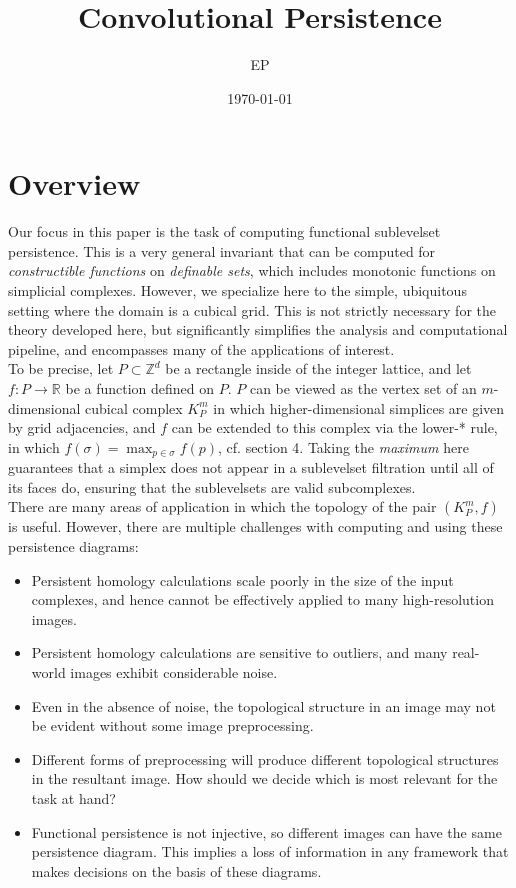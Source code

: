 \documentclass[12pt]{amsart}
\title{Convolutional Persistence}
\author{EP}
\date{\today}
\numberwithin{figure}{section}
\begin{document}
	
	\maketitle
	\thispagestyle{empty}
	
	
\section{Overview}
Our focus in this paper is the task of computing functional sublevelset persistence. This is a very general invariant that can be computed for \emph{constructible functions} on \emph{definable sets}, which includes monotonic functions on simplicial complexes. However, we specialize here to the simple, ubiquitous setting where the domain is a cubical grid. This is not strictly necessary for the theory developed here, but significantly simplifies the analysis and computational pipeline, and encompasses many of the applications of interest.\\

To be precise, let $P \subset \mathbb{Z}^d$ be a rectangle inside of the integer lattice, and let $f: P \to \mathbb{R}$ be a function defined on $P$. $P$ can be viewed as the vertex set of an $m$-dimensional cubical complex $K^{m}_{P}$ in which higher-dimensional simplices are given by grid adjacencies, and $f$ can be extended to this complex via the lower-* rule, in which $f(\sigma) = \max_{p \in \sigma}f(p)$, cf. \cite{bleile2021persistent} section 4. Taking the \emph{maximum} here guarantees that a simplex does not appear in a sublevelset filtration until all of its faces do, ensuring that the sublevelsets are valid subcomplexes.\\

There are many areas of application in which the topology of the pair $(K^{m}_{P},f)$ is useful. However, there are multiple challenges with computing and using these persistence diagrams:
\begin{itemize}
	\item Persistent homology calculations scale poorly in the size of the input complexes, and hence cannot be effectively applied to many high-resolution images.
	\item Persistent homology calculations are sensitive to outliers, and many real-world images exhibit considerable noise.
	\item Even in the absence of noise, the topological structure in an image may not be evident without some image preprocessing.
	\item Different forms of preprocessing will produce different topological structures in the resultant image. How should we decide which is most relevant for the task at hand?
	\item Functional persistence is not injective, so different images can have the same persistence diagram. This implies a loss of information in any framework that makes decisions on the basis of these diagrams.
\end{itemize}
\end{document}
